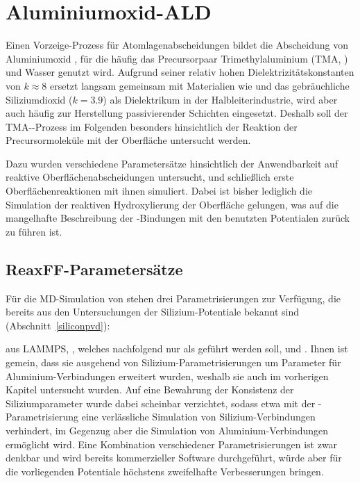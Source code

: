 \section{Aluminiumoxid-ALD}
\label{aluminaald}

Einen Vorzeige-Prozess für Atomlagenabscheidungen bildet die Abscheidung von Aluminiumoxid , für die häufig das Precursorpaar Trimethylaluminium (TMA, ) und Wasser genutzt wird\cite{puurunen_surface_2005}.
Aufgrund seiner relativ hohen Dielektrizitätskonstanten von $k\approx 8$ ersetzt  langsam gemeinsam mit Materialien wie  und \cite{smith_chemical_2000} das gebräuchliche Siliziumdioxid ($k=3.9$) als Dielektrikum in der Halbleiterindustrie, wird aber auch häufig zur Herstellung passivierender Schichten eingesetzt\cite{yun_passivation_2004,poodt_high-speed_2010}.
Deshalb soll der TMA--Prozess im Folgenden besonders hinsichtlich der Reaktion der Precursormoleküle mit der Oberfläche untersucht werden.

Dazu wurden verschiedene Parametersätze hinsichtlich der Anwendbarkeit auf reaktive Oberflächenabscheidungen untersucht, und schließlich erste Oberflächenreaktionen mit ihnen simuliert.
Dabei ist bisher lediglich die Simulation der reaktiven Hydroxylierung der Oberfläche gelungen, was auf die mangelhafte Beschreibung der -Bindungen mit den benutzten Potentialen zurück zu führen ist.

\subsection{ReaxFF-Parametersätze}

Für die MD-Simulation von  stehen drei Parametrisierungen zur Verfügung, die bereits aus den Untersuchungen der Silizium-Potentiale bekannt sind (Abschnitt~\ref{siliconpvd}):

 aus LAMMPS\cite{plimpton_lammps_2014}, \cite{liu_development_2012}, welches nachfolgend nur als  geführt werden soll, und \cite{narayanan_reactive_2012}.
Ihnen ist gemein, dass sie ausgehend von Silizium-Parametrisierungen um Parameter für Aluminium-Verbindungen erweitert wurden, weshalb sie auch im vorherigen Kapitel untersucht wurden.
Auf eine Bewahrung der Konsistenz der Siliziumparameter wurde dabei scheinbar verzichtet, sodass etwa mit der -Parametrisierung eine verlässliche Simulation von Silizium-Verbindungen verhindert, im Gegenzug aber die Simulation von Aluminium-Verbindungen ermöglicht wird.
Eine Kombination verschiedener Parametrisierungen ist zwar denkbar und wird bereits kommerzieller Software durchgeführt\cite{biovia_materials_2014}, würde aber für die vorliegenden Potentiale höchstens zweifelhafte Verbesserungen bringen.

